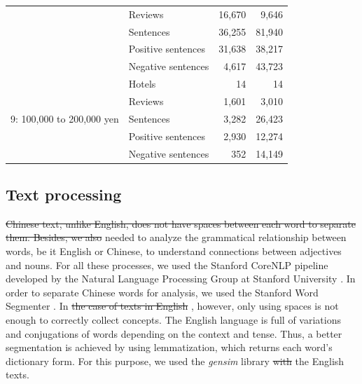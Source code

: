 \documentclass[smallextended,natbib]{svjour3}       %
\providecommand{\DIFadd}[1]{{\protect\color{blue}\uwave{#1}}} %
\providecommand{\DIFdel}[1]{{\protect\color{red}\sout{#1}}}                      %
\providecommand{\DIFaddbegin}{} %
\providecommand{\DIFaddend}{} %
\providecommand{\DIFdelbegin}{} %
\providecommand{\DIFdelend}{} %
\newcommand{\DIFscaledelfig}{0.5}
\newlength{\DIFdelgraphicswidth} %
\newlength{\DIFdelgraphicsheight} %
\newcommand{\DIFaddincludegraphics}[2][]{{\color{blue}\fbox{\DIFOincludegraphics[#1]{#2}}}} %
\newcommand{\DIFdelincludegraphics}[2][]{%
\sbox{\DIFdelgraphicsbox}{\DIFOincludegraphics[#1]{#2}}%
\settoboxwidth{\DIFdelgraphicswidth}{\DIFdelgraphicsbox} %
\settoboxtotalheight{\DIFdelgraphicsheight}{\DIFdelgraphicsbox} %
\scalebox{\DIFscaledelfig}{%
\parbox[b]{\DIFdelgraphicswidth}{\usebox{\DIFdelgraphicsbox}\\[-\baselineskip] \rule{\DIFdelgraphicswidth}{0em}}\llap{\resizebox{\DIFdelgraphicswidth}{\DIFdelgraphicsheight}{%
\setlength{\unitlength}{\DIFdelgraphicswidth}%
\begin{picture}(1,1)%
\thicklines\linethickness{2pt} %
{\color[rgb]{1,0,0}\put(0,0){\framebox(1,1){}}}%
{\color[rgb]{1,0,0}\put(0,0){\line( 1,1){1}}}%
{\color[rgb]{1,0,0}\put(0,1){\line(1,-1){1}}}%
\end{picture}%
}\hspace*{3pt}}} %
} %
\DeclareRobustCommand{\DIFaddbegin}{\DIFOaddbegin \let\includegraphics\DIFaddincludegraphics} %
\DeclareRobustCommand{\DIFaddend}{\DIFOaddend \let\includegraphics\DIFOincludegraphics} %
\DeclareRobustCommand{\DIFdelbegin}{\DIFOdelbegin \let\includegraphics\DIFdelincludegraphics} %
\DeclareRobustCommand{\DIFdelend}{\DIFOaddend \let\includegraphics\DIFOincludegraphics} %
\begin{document}
\begin{table}[ht]
{\begin{tabular}{|l|l|r|r|}
                                                   & Reviews            & 16,670  & 9,646   \\
                                                   & Sentences          & 36,255  & 81,940  \\
                                                   & Positive sentences & 31,638  & 38,217  \\
                                                   & Negative sentences & 4,617   & 43,723  \\ \hline
        \multirow{5}{*}{9: 100,000 to 200,000 yen}   & Hotels             & 14      & 14      \\
                                                   & Reviews            & 1,601   & 3,010   \\
                                                   & Sentences          & 3,282   & 26,423  \\
                                                   & Positive sentences & 2,930   & 12,274  \\
                                                   & Negative sentences & 352     & 14,149  \\ \hline
        \end{tabular}%
      }
    \end{table}
  \subsection{Text processing}\label{textprocessing}

    \DIFdelbegin \DIFdel{Chinese text, unlike English, does not have spaces between each word to separate them. Besides, we also }\DIFdelend \DIFaddbegin \DIFadd{We }\DIFaddend needed to analyze the grammatical relationship between words, be it English or Chinese, to understand \DIFaddbegin \DIFadd{the }\DIFaddend connections between adjectives and nouns. For all these processes, we used the Stanford CoreNLP pipeline developed by the Natural Language Processing Group at Stanford University \cite[][]{manning-EtAl:2014:P14-5}. In order to separate Chinese words for analysis, we used the Stanford Word Segmenter \cite[][]{chang2008}. In \DIFdelbegin \DIFdel{the case of texts in English }\DIFdelend \DIFaddbegin \DIFadd{English texts}\DIFaddend , however, only using spaces is not enough to correctly collect concepts. The English language is full of variations and conjugations of words depending on the context and tense. Thus, a better segmentation is achieved by using lemmatization, which returns each word's dictionary form. For this purpose, we used the \textit{gensim} library \DIFdelbegin \DIFdel{with }\DIFdelend \DIFaddbegin \DIFadd{for }\DIFaddend the English texts.
\end{document}
